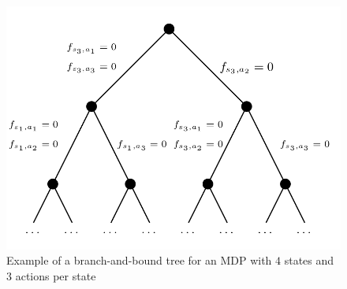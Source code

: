 \documentclass[sigconf]{aamas}  %
\begin{document}
\begin{figure}
	\begin{center}
    \includegraphics[scale=0.25]{images/bb.png}
	\end{center}
	\caption{Example of a branch-and-bound tree for an MDP with $4$ states and $3$ actions per state}
	\label{fig:pic_bb}
\end{figure}

%
%

\end{document}
